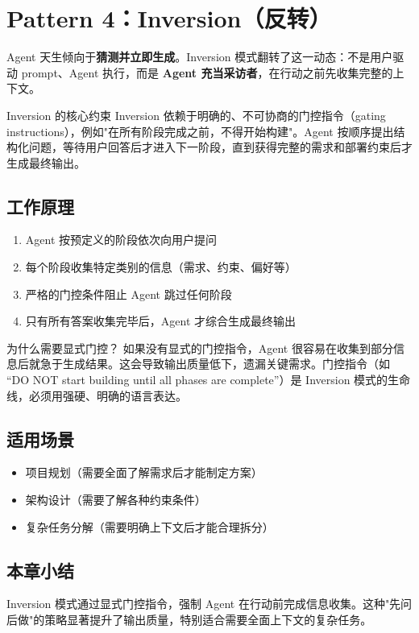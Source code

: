 \section{Pattern 4：Inversion（反转）}

Agent 天生倾向于\textbf{猜测并立即生成}。Inversion 模式翻转了这一动态：不是用户驱动 prompt、Agent 执行，而是 \textbf{Agent 充当采访者}，在行动之前先收集完整的上下文。

\begin{importantbox}{Inversion 的核心约束}
Inversion 依赖于明确的、不可协商的门控指令（gating instructions），例如"在所有阶段完成之前，不得开始构建"。Agent 按顺序提出结构化问题，等待用户回答后才进入下一阶段，直到获得完整的需求和部署约束后才生成最终输出。
\end{importantbox}

\subsection{工作原理}

\begin{enumerate}
    \item Agent 按预定义的阶段依次向用户提问
    \item 每个阶段收集特定类别的信息（需求、约束、偏好等）
    \item 严格的门控条件阻止 Agent 跳过任何阶段
    \item 只有所有答案收集完毕后，Agent 才综合生成最终输出
\end{enumerate}

\begin{warningbox}{为什么需要显式门控？}
如果没有显式的门控指令，Agent 很容易在收集到部分信息后就急于生成结果。这会导致输出质量低下，遗漏关键需求。门控指令（如 ``DO NOT start building until all phases are complete''）是 Inversion 模式的生命线，必须用强硬、明确的语言表达。
\end{warningbox}

\subsection{适用场景}

\begin{itemize}
    \item 项目规划（需要全面了解需求后才能制定方案）
    \item 架构设计（需要了解各种约束条件）
    \item 复杂任务分解（需要明确上下文后才能合理拆分）
\end{itemize}

\subsection{本章小结}

Inversion 模式通过显式门控指令，强制 Agent 在行动前完成信息收集。这种"先问后做"的策略显著提升了输出质量，特别适合需要全面上下文的复杂任务。


